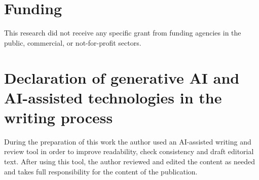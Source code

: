 \documentclass[preprint,12pt]{elsarticle}
\begin{document}
\section*{Funding}

This research did not receive any specific grant from funding agencies in
the public, commercial, or not-for-profit sectors.

\section*{Declaration of generative AI and AI-assisted technologies in
the writing process}

During the preparation of this work the author used an AI-assisted
writing and review tool in order to improve readability, check
consistency and draft editorial text. After using this tool, the author
reviewed and edited the content as needed and takes full responsibility
for the content of the publication.
\end{document}
